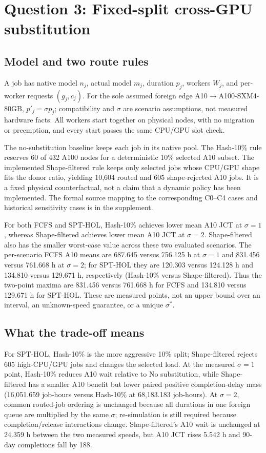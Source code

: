 \section{Question 3: Fixed-split cross-GPU substitution}
\label{sec:r2q3}
\subsection{Model and two route rules}
A job has native model $n_j$, actual model $m_j$, duration $p_j$, workers $W_j$, and per-worker requests $(g_j,c_j)$. For the sole assumed foreign edge A10$\to$A100-SXM4-80GB, $p'_j=\sigma p_j$; compatibility and $\sigma$ are scenario assumptions, not measured hardware facts. All workers start together on physical nodes, with no migration or preemption, and every start passes the same CPU/GPU slot check.

The no-substitution baseline keeps each job in its native pool. The Hash-10\% rule reserves 60 of 432 A100 nodes for a deterministic 10\% selected A10 subset. The implemented Shape-filtered rule keeps only selected jobs whose CPU/GPU shape fits the donor ratio, yielding 10,604 routed and 605 shape-rejected A10 jobs. It is a fixed physical counterfactual, not a claim that a dynamic policy has been implemented. The formal source mapping to the corresponding C0--C4 cases and historical sensitivity cases is in the supplement.



For both FCFS and SPT-HOL, Hash-10\% achieves lower mean A10 JCT at $\sigma=1$, whereas Shape-filtered achieves lower mean A10 JCT at $\sigma=2$. Shape-filtered also has the smaller worst-case value across these two evaluated scenarios. The per-scenario FCFS A10 means are 687.645 versus 756.125 h at $\sigma=1$ and 831.456 versus 761.668 h at $\sigma=2$; for SPT-HOL they are 120.303 versus 124.128 h and 134.810 versus 129.671 h, respectively (Hash-10\% versus Shape-filtered). Thus the two-point maxima are 831.456 versus 761.668 h for FCFS and 134.810 versus 129.671 h for SPT-HOL. These are measured points, not an upper bound over an interval, an unknown-speed guarantee, or a unique $\sigma^*$.

\subsection{What the trade-off means}
For SPT-HOL, Hash-10\% is the more aggressive 10\% split; Shape-filtered rejects 605 high-CPU/GPU jobs and changes the selected load. At the measured $\sigma=1$ point, Hash-10\% reduces A10 wait relative to No substitution, while Shape-filtered has a smaller A10 benefit but lower paired positive completion-delay mass (16,051.659 job-hours versus Hash-10\% at 68,183.183 job-hours). At $\sigma=2$, common routed-job ordering is unchanged because all durations in one foreign queue are multiplied by the same $\sigma$; re-simulation is still required because completion/release interactions change. Shape-filtered's A10 wait is unchanged at 24.359 h between the two measured speeds, but A10 JCT rises 5.542 h and 90-day completions fall by 188.

